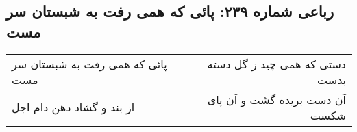 \begin{center}
\section*{رباعی شماره ۲۳۹: پائی که همی رفت به شبستان سر مست}
\label{sec:0239}
\begin{longtable}{l p{0.5cm} r}
پائی که همی رفت به شبستان سر مست
&&
دستی که همی چید ز گل دسته بدست
\\
از بند و گشاد دهن دام اجل
&&
آن دست بریده گشت و آن پای شکست
\\
\end{longtable}
\end{center}

